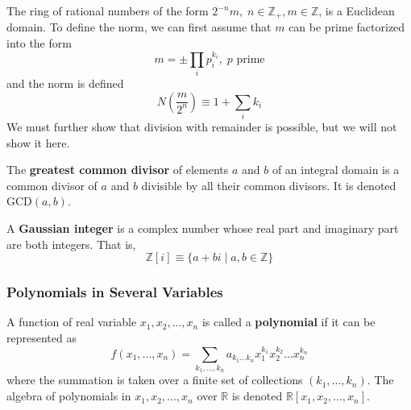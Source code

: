     \begin{example}
      The ring of rational numbers of the form $2^{-n} m, \; n \in \mathbb{Z}_+, m \in \mathbb{Z}$, is a Euclidean domain. To define the norm, we can first assume that $m$ can be prime factorized into the form 
      \begin{equation}
        m = \pm \prod_{i} p_{i}^{k_i}, \; p \text{ prime}
      \end{equation}
      and the norm is defined 
      \begin{equation}
        N(\frac{m}{2^n}) \equiv 1 + \sum_i k_i
      \end{equation}
      We must further show that division with remainder is possible, but we will not show it here. 
    \end{example}

    \begin{definition}
      The \textbf{greatest common divisor} of elements $a$ and $b$ of an integral domain is a common divisor of $a$ and $b$ divisible by all their common divisors. It is denoted GCD$(a, b)$. 
    \end{definition}

    \begin{definition}
      A \textbf{Gaussian integer} is a complex number whose real part and imaginary part are both integers. That is, 
      \begin{equation}
        \mathbb{Z}[i] \equiv \{a + b i \;|\; a, b \in \mathbb{Z} \}
      \end{equation}
    \end{definition}

  \subsubsection{Polynomials in Several Variables}

    \begin{definition}
      A function of real variable $x_1, x_2, ..., x_n$ is called a \textbf{polynomial} if it can be represented as 
      \begin{equation}
        f(x_1, ..., x_n) =  \sum_{k_1, ..., k_n} a_{k_1 ... k_n} x_1^{k_1} x_2^{k_2} ... x_n^{k_n}
      \end{equation}
      where the summation is taken over a finite set of collections $(k_1, ..., k_n)$. The algebra of polynomials in $x_1, x_2, ..., x_n$ over $\mathbb{R}$ is denoted $\mathbb{R}[x_1, x_2, ..., x_n]$. 
    \end{definition}

